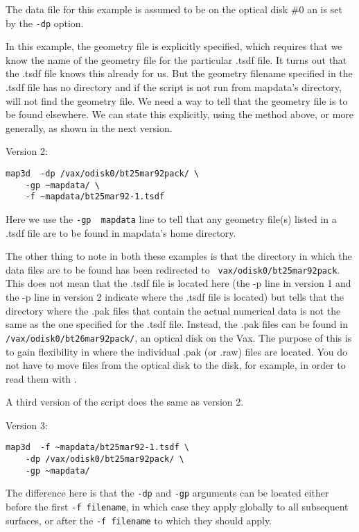 The data file for this example is assumed to be on the optical disk \#0 an
is set by the {\tt -dp} option. 

In this example, the geometry file is explicitly specified, which requires
that we know the name of the geometry file for the particular .tsdf file.
It turns out that the .tsdf file knows this already for us.  But the
geometry filename specified in the .tsdf file has no directory and if the
script is not run from mapdata's directory, \map{} will not find the geometry
file.  We need a way to tell \map{} that the geometry file is to be found
elsewhere.  We can state this explicitly, using the method above, or more
generally, as shown in the next version.

\noindent
Version 2:

\begin{verbatim}
map3d  -dp /vax/odisk0/bt25mar92pack/ \
	-gp ~mapdata/ \
	-f ~mapdata/bt25mar92-1.tsdf
\end{verbatim}

Here we use the {\tt -gp ~mapdata} line to tell \map{} that any geometry
file(s) listed in a .tsdf file are to be found in mapdata's home directory.

The other thing to note in both these examples is that the directory in
which the data files are to be found has been redirected to {\tt
vax/odisk0/bt25mar92pack}.  This does not mean that the .tsdf file is
located here (the -p line in version 1 and the -p line in version 2
indicate where the .tsdf file is located) but tells \map{} that the
directory where the .pak files that contain the actual numerical data is
not the same as the one specified for the .tsdf file.  Instead, the .pak
files can be found in {\tt /vax/odisk0/bt26mar92pack/}, an optical disk on
the Vax.  The purpose of this is to gain flexibility in where the
individual .pak (or .raw) files are located.  You do not have to move files
from the optical disk to the disk, for example, in order to read them with
\map{}.

A third version of the script does the same as version 2.

\noindent
Version 3:

\begin{verbatim}
map3d  -f ~mapdata/bt25mar92-1.tsdf \
	-dp /vax/odisk0/bt25mar92pack/ \
	-gp ~mapdata/
\end{verbatim}

The difference here is that the {\tt -dp} and {\tt -gp} arguments can be
located either before the first {\tt -f filename}, in which case they apply
globally to all subsequent surfaces, or after the {\tt -f filename} to
which they should apply.

